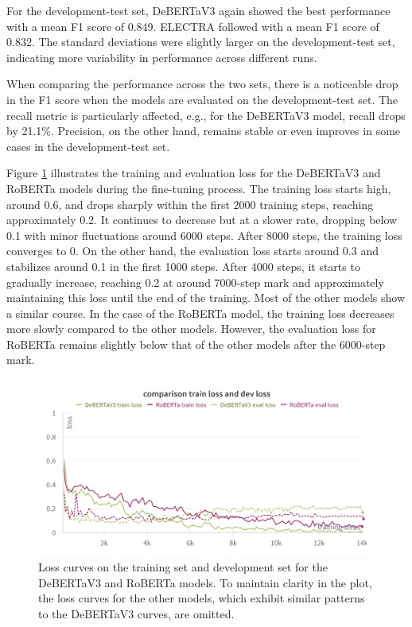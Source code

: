 For the development-test set, DeBERTaV3 again showed the best performance with a mean F1 score of 0.849. ELECTRA followed with a mean F1 score of 0.832. The standard deviations were slightly larger on the development-test set, indicating more variability in performance across different runs.

When comparing the performance across the two sets, there is a noticeable drop in the F1 score when the models are evaluated on the development-test set. The recall metric is particularly affected, e.g., for the DeBERTaV3 model, recall drops by 21.1\%. Precision, on the other hand, remains stable or even improves in some cases in the development-test set.

Figure \ref{fig:loss_curve} illustrates the training and evaluation loss for the DeBERTaV3 and RoBERTa models during the fine-tuning process. The training loss starts high, around 0.6, and drops sharply within the first 2000 training steps, reaching approximately 0.2. It continues to decrease but at a slower rate, dropping below 0.1 with minor fluctuations around 6000 steps. After 8000 steps, the training loss converges to 0. On the other hand, the evaluation loss starts around 0.3 and stabilizes around 0.1 in the first 1000 steps. After 4000 steps, it starts to gradually increase, reaching 0.2 at around 7000-step mark and approximately maintaining this loss until the end of the training. Most of the other models show a similar course. In the case of the RoBERTa model, the training loss decreases more slowly compared to the other models. However, the evaluation loss for RoBERTa remains slightly below that of the other models after the 6000-step mark.

\begin{figure}[H]
    \centering
    \includegraphics[width=1\linewidth]{assets/deberta and roberta loss curves.png}
    \caption{Loss curves on the training set and development set for the DeBERTaV3 and RoBERTa models. To maintain clarity in the plot, the loss curves for the other models, which exhibit similar patterns to the DeBERTaV3 curves, are omitted.}
    \label{fig:loss_curve}
\end{figure}

